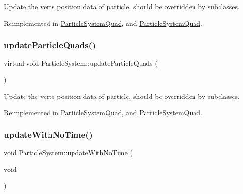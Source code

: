 Update the verts position data of particle, should be overridden by subclasses. 

Reimplemented in \hyperlink{classParticleSystemQuad_aaa4944b341aea804011cc17160a59068}{Particle\+System\+Quad}, and \hyperlink{classParticleSystemQuad_a4f73ff1d0afde788ba41f0bcbe8dd9d5}{Particle\+System\+Quad}.

\mbox{\label{classParticleSystem_a517376136d7bee60f3e56639c89ee407}} 
\subsubsection{\texorpdfstring{update\+Particle\+Quads()}{updateParticleQuads()}\hspace{0.1cm}{\footnotesize\ttfamily [2/2]}}
{\footnotesize\ttfamily virtual void Particle\+System\+::update\+Particle\+Quads (\begin{DoxyParamCaption}{ }\end{DoxyParamCaption})\hspace{0.3cm}{\ttfamily [virtual]}}

Update the verts position data of particle, should be overridden by subclasses. 

Reimplemented in \hyperlink{classParticleSystemQuad_aaa4944b341aea804011cc17160a59068}{Particle\+System\+Quad}, and \hyperlink{classParticleSystemQuad_a4f73ff1d0afde788ba41f0bcbe8dd9d5}{Particle\+System\+Quad}.

\mbox{\label{classParticleSystem_a5196d40cc09eb4899dce1e06d28f0a1c}} 
\subsubsection{\texorpdfstring{update\+With\+No\+Time()}{updateWithNoTime()}\hspace{0.1cm}{\footnotesize\ttfamily [1/2]}}
{\footnotesize\ttfamily void Particle\+System\+::update\+With\+No\+Time (\begin{DoxyParamCaption}\item[{void}]{ }\end{DoxyParamCaption})\hspace{0.3cm}{\ttfamily [virtual]}}

